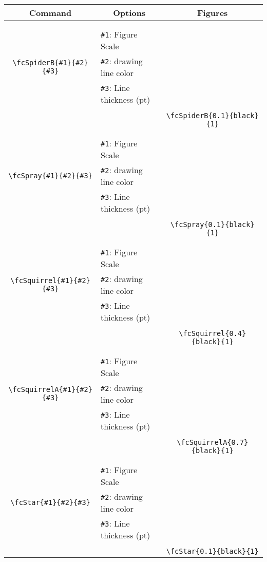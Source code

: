 \documentclass[x11names]{article}
\begin{document}
\begin{table}[H]\centering\begin{tabular}{|c|l|c|}\hline {\bf Command}& \multicolumn{1}{c|}{{\bf Options}} & {\bf Figures}\\  \hline	&&\multirow{5}{*}{\fcSpiderB{0.1}{black}{1}}\\	&&\\	&\verb|#1|: Figure Scale &\\	\verb|\fcSpiderB{#1}{#2}{#3}|&	\verb|#2|: drawing line color &\\	&\verb|#3|: Line thickness (pt) &\\ &&\\&&	\verb|\fcSpiderB{0.1}{black}{1}|\\\hline 	
	&&\multirow{5}{*}{\fcSpray{0.1}{black}{1}}\\	&&\\	&\verb|#1|: Figure Scale &\\	\verb|\fcSpray{#1}{#2}{#3}|&	\verb|#2|: drawing line color &\\	&\verb|#3|: Line thickness (pt) &\\ &&\\&&	\verb|\fcSpray{0.1}{black}{1}|\\\hline 	
	&&\multirow{5}{*}{\fcSquirrel{0.4}{black}{1}}\\	&&\\	&\verb|#1|: Figure Scale &\\	\verb|\fcSquirrel{#1}{#2}{#3}|&	\verb|#2|: drawing line color &\\	&\verb|#3|: Line thickness (pt) &\\ &&\\&&	\verb|\fcSquirrel{0.4}{black}{1}|\\\hline 	
	&&\multirow{5}{*}{\fcSquirrelA{0.7}{black}{1}}\\	&&\\	&\verb|#1|: Figure Scale &\\	\verb|\fcSquirrelA{#1}{#2}{#3}|&	\verb|#2|: drawing line color &\\	&\verb|#3|: Line thickness (pt) &\\ &&\\&&	\verb|\fcSquirrelA{0.7}{black}{1}|\\\hline 	
	&&\multirow{5}{*}{\fcStar{0.1}{black}{1}}\\	&&\\	&\verb|#1|: Figure Scale &\\	\verb|\fcStar{#1}{#2}{#3}|&	\verb|#2|: drawing line color &\\	&\verb|#3|: Line thickness (pt) &\\ &&\\&&	\verb|\fcStar{0.1}{black}{1}|\\\hline 	

\end{tabular}
\end{table}
\end{document}

